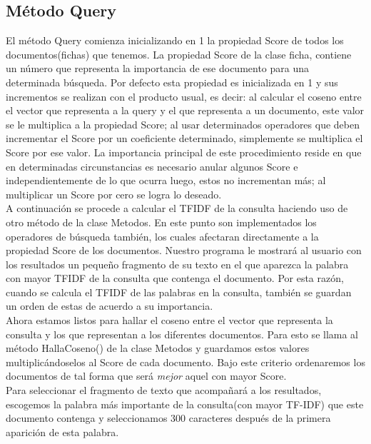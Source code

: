 \documentclass[a4paper,12pt]{article}
\begin{document}
            \subsection{M\'etodo Query}
                El m\'etodo Query comienza inicializando en 1 la propiedad Score de todos los documentos(fichas) que tenemos. La propiedad Score 
                de la clase ficha, contiene un n\'umero que representa la importancia de ese documento para una determinada b\'usqueda. Por defecto esta propiedad
                es inicializada en 1 y sus incrementos se realizan con el producto usual, es decir: al calcular el coseno entre el vector que representa
                a la query y el que representa a un documento, este valor se le multiplica a la propiedad Score; al usar determinados operadores que deben incrementar el Score
                por un coeficiente determinado, simplemente se multiplica el Score por ese valor. La importancia principal de este procedimiento reside
                en que en determinadas circunstancias es necesario anular algunos Score e independientemente de lo que ocurra luego, estos no incrementan
                m\'as; al multiplicar un Score por cero se logra lo deseado.\\

                A continuaci\'on se procede a calcular el TFIDF de la consulta haciendo uso de otro m\'etodo de la clase Metodos. En este punto son implementados los operadores de b\'usqueda tambi\'en,
                los cuales afectaran directamente a la propiedad Score de los documentos.
                Nuestro programa le mostrar\'a al usuario con los resultados un peque\~no fragmento de su texto en el que aparezca la palabra con mayor TFIDF de la consulta que contenga el documento. 
                Por esta raz\'on, cuando se calcula el TFIDF de las palabras en la consulta, tambi\'en se guardan un orden de estas de acuerdo a su importancia.\\
                Ahora estamos listos para hallar el coseno entre el vector que representa la consulta y los que representan a los diferentes documentos. Para esto se llama al m\'etodo HallaCoseno()
                de la clase Metodos y guardamos estos valores multiplic\'andoselos al Score de cada documento. Bajo este criterio ordenaremos los documentos de tal forma que ser\'a
                {\it mejor} aquel con mayor Score.\\

                Para seleccionar el fragmento de texto que acompa\~nar\'a a los resultados, escogemos la palabra m\'as importante de la consulta(con mayor TF-IDF) que este documento contenga y seleccionamos 300
                caracteres despu\'es de la primera aparici\'on de esta palabra.\\
\end{document}
